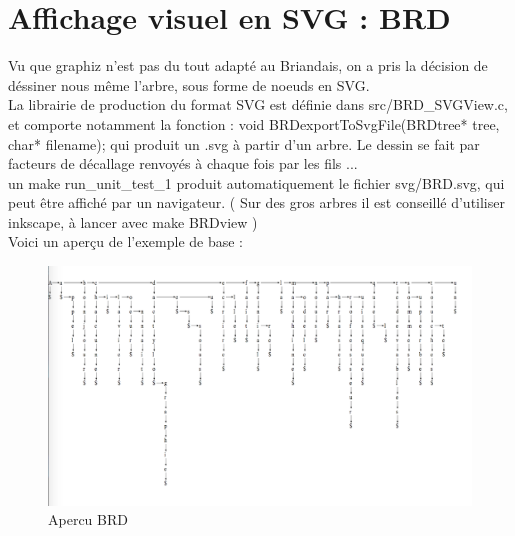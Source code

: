 \documentclass[a4paper,8pt]{report}
\begin{document}
\clearpage
\section*{Affichage visuel en SVG : BRD}\label{sec:name}
Vu que graphiz n'est pas du tout adapté au Briandais, on a pris la décision de déssiner nous même l'arbre, sous forme de noeuds en SVG.\\
La librairie de production du format SVG est définie dans src/BRD\_SVGView.c, et comporte notamment la fonction :
void BRDexportToSvgFile(BRDtree* tree, char* filename); qui produit un .svg à partir d'un arbre. Le dessin se fait par facteurs de décallage renvoyés à chaque fois par les fils ...\\
un make run\_unit\_test\_1 produit automatiquement le fichier svg/BRD.svg, qui peut être affiché par un navigateur. ( Sur des gros arbres il est conseillé d'utiliser inkscape, à lancer avec make BRDview )\\
Voici un aperçu de l'exemple de base :\\
\begin{figure}[H]
  \centering
  \includegraphics[width=1.3\textwidth]{BRD.png}
  \caption{Apercu BRD}
  \label{fig:Aprecu BRD}
\end{figure}

\clearpage
\end{document}
